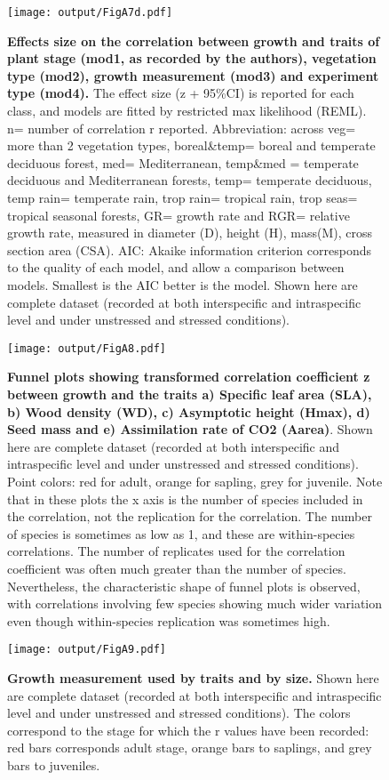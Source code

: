 \documentclass[a4paper]{article}\usepackage[]{graphicx}\usepackage[]{color}
\begin{document}
\begin{appendices}
\begin{figure}[htbp]
\centering
\texttt{[image: output/FigA7d.pdf]}
\caption{\textbf{Effects size on the correlation between growth and traits of plant stage (mod1, as recorded by the authors), vegetation type (mod2), growth measurement (mod3) and experiment type (mod4).} The effect size (z + 95\%CI) is reported for each class, and models are fitted by restricted max likelihood (REML). n= number of correlation r reported. Abbreviation: across veg= more than 2 vegetation types, boreal\&temp= boreal and temperate deciduous forest, med= Mediterranean,  temp\&med = temperate deciduous and Mediterranean forests, temp= temperate deciduous, temp rain= temperate rain, trop rain= tropical rain, trop seas= tropical seasonal forests, GR= growth rate and RGR= relative growth rate, measured in diameter (D), height (H), mass(M), cross section area (CSA). AIC: Akaike information criterion corresponds to the quality of each model, and allow a comparison between models. Smallest is the AIC better is the model. Shown here are complete dataset (recorded at both interspecific and intraspecific level and under unstressed and stressed conditions).}
\label{FigA7}
\end{figure}

\begin{figure}[htbp]
\centering
\texttt{[image: output/FigA8.pdf]}
\caption{\textbf{Funnel plots showing transformed correlation coefficient z between growth and the traits a) Specific leaf area (SLA), b) Wood density (WD), c) Asymptotic height (Hmax), d) Seed mass and e) Assimilation rate of CO2 (Aarea)}. Shown here are complete dataset (recorded at both interspecific and intraspecific level and under unstressed and stressed conditions). Point colors: red for adult, orange for sapling, grey for juvenile. Note that in these plots the x axis is the number of species included in the correlation, not the replication for the correlation. The number of species is sometimes as low as 1, and these are within-species correlations. The number of replicates used for the correlation coefficient was often much greater than the number of species. Nevertheless, the characteristic shape of funnel plots is observed, with correlations involving few species showing much wider variation even though within-species replication was sometimes high.}

\label{FigA8}
\end{figure}

\begin{figure}[htbp]
\centering
\texttt{[image: output/FigA9.pdf]}
\caption{\textbf{Growth measurement used by traits and by size.} Shown here are complete dataset (recorded at both interspecific and intraspecific level and under unstressed and stressed conditions). The colors correspond to the stage for which the r values have been recorded: red bars corresponds adult stage, orange bars to saplings, and grey bars to juveniles.}
\label{FigA9}
\end{figure}

\end{appendices}
\end{document}
